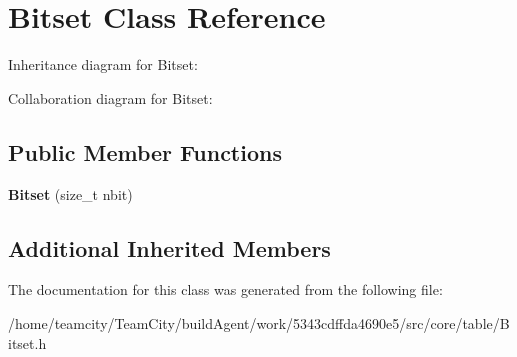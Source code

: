 \hypertarget{classBitset}{}\section{Bitset Class Reference}
\label{classBitset}


Inheritance diagram for Bitset\+:


Collaboration diagram for Bitset\+:
\subsection*{Public Member Functions}
\begin{DoxyCompactItemize}
\item 
{\bfseries Bitset} (size\+\_\+t nbit)\hypertarget{classBitset_abfc9f780afcf5f1595320db5b3a8a51a}{}\label{classBitset_abfc9f780afcf5f1595320db5b3a8a51a}

\end{DoxyCompactItemize}
\subsection*{Additional Inherited Members}


The documentation for this class was generated from the following file\+:\begin{DoxyCompactItemize}
\item 
/home/teamcity/\+Team\+City/build\+Agent/work/5343cdffda4690e5/src/core/table/Bitset.\+h\end{DoxyCompactItemize}
